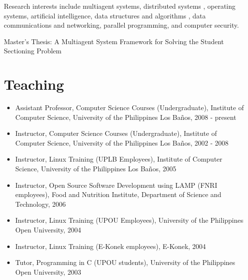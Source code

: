 \documentclass[overlapped,line,letterpaper]{res}
\begin{document}
\begin{resume}
Research interests include multiagent systems, distributed systems
, operating systems, artificial intelligence, data structures and algorithms
, data communications and networking, parallel programming, and computer security.

Master's Thesis: A Multiagent System Framework for Solving the Student Sectioning Problem


\section{\bf Teaching}

\begin{itemize}
\item Assistant Professor, Computer Science Courses (Undergraduate),
Institute of Computer Science, University of the Philippines Los Ba\~{n}os, 2008 - present
\item Instructor, Computer Science Courses (Undergraduate),
Institute of Computer Science, University of the Philippines Los Ba\~{n}os, 2002 - 2008
\item Instructor, Linux Training (UPLB Employees), 
Institute of Computer Science, University of the Philippines Los Ba\~{n}os, 2005
\item Instructor, Open Source Software Development using LAMP (FNRI employees), 
Food and Nutrition Institute, Department of Science and Technology, 2006
\item Instructor, Linux Training (UPOU Employees), 
University of the Philippines Open University, 2004
\item Instructor, Linux Training (E-Konek employees), 
E-Konek, 2004
\item Tutor, Programming in C (UPOU students), 
University of the Philippines Open University, 2003
\end{itemize}



\end{resume}
\end{document}
